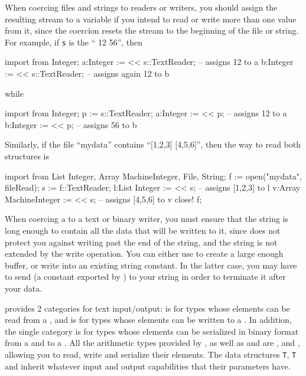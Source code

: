 When coercing files and strings to readers or writers, you should assign the
resulting stream to a variable if you intend to read or write more than
one value from it, since the coercion resets the stream to the beginning
of the file or string. For example, if {\tt s} is the 
``   12   56'', then
\begin{ttyout}
import from Integer;
a:Integer := << s::TextReader;             -- assigns 12 to a
b:Integer := << s::TextReader;             -- assigns again 12 to b
\end{ttyout}
while
\begin{ttyout}
import from Integer;
p := s::TextReader;
a:Integer := << p;                         -- assigns 12 to a
b:Integer := << p;                         -- assigns 56 to b
\end{ttyout}
Similarly, if the file ``mydata''
contains ``[1,2,3]  [4,5,6]'', then the way to read both structures is
\begin{ttyout}
import from List Integer, Array MachineInteger, File, String;
f := open("mydata", fileRead);
s := f::TextReader;
l:List Integer := << s;                     -- assigns [1,2,3] to l
v:Array MachineInteger := << s;             -- assigns [4,5,6] to v
close! f;
\end{ttyout}
When coercing a  to a text or binary writer, you must ensure
that the string is long enough to contain all the data that will be written to
it, since \salli does not protect you against writing past the end of the
string, and the string is not extended by the write operation. You can
either use  to create a large enough buffer,
or write into an existing string constant. In the latter case, you may have
to send  (a constant exported by )
to your string in order to terminate it after your data.

\salli provides 2 categories for text input/output: 
is for types whose elements can be read from a ,
and  is for types whose elements can be written
to a . In addition, the single category
 is for types whose elements can be serialized
in binary format from a  and to a .
All the arithmetic types provided by \salli, as well as 
and  are ,  and
,
allowing you to read, write and serialize their elements. The data structures
 {\tt T},  {\tt T} and 
 inherit whatever input
and output capabilities that their parameters have.

